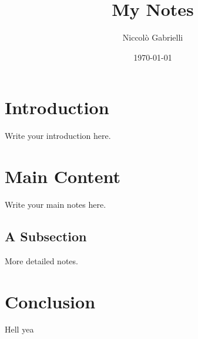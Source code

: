 \documentclass[a4paper,12pt]{article}
\title{My Notes}
\author{Niccolò Gabrielli}
\date{\today}
\begin{document}
\maketitle

\section{Introduction}
Write your introduction here.

\section{Main Content}
Write your main notes here.

\subsection{A Subsection}
More detailed notes.

\section{Conclusion}
Hell yea
\end{document}
